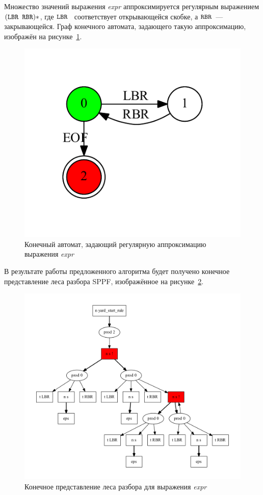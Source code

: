 Множество значений выражения \emph{expr} аппроксимируется регулярным выражением $(\mbox{\texttt{LBR }} \mbox{\texttt{RBR}})*$, где $\mbox{\texttt{LBR }}$ соответствует открывающейся скобке, а $\mbox{\texttt{RBR}}$~--- закрывающейся. Граф конечного автомата, задающего такую аппроксимацию, изображён на рисунке~\ref{input}.
\begin{figure}[!h]
 \centering
 \includegraphics[]{pics/input.pdf}
 \caption{Конечный автомат, задающий регулярную аппроксимацию выражения \emph{expr}}
 \label{input}
\end{figure}

В результате работы предложенного алгоритма будет получено конечное представление леса разбора SPPF, изображённое на рисунке~\ref{sppf}.
\begin{figure}[!h]
 \centering
 \includegraphics[width=15cm]{pics/sppf.pdf}
 \caption{Конечное представление леса разбора для выражения \emph{expr}}
 \label{sppf}
\end{figure}

